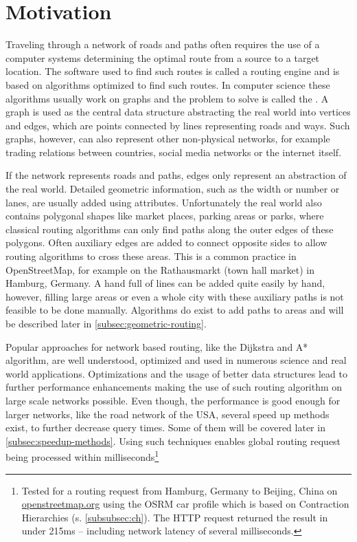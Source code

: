 
\section{Motivation}
	
	Traveling through a network of roads and paths often requires the use of a computer systems determining the optimal route from a source to a target location.
	The software used to find such routes is called a routing engine and is based on algorithms optimized to find such routes.
	In computer science these algorithms usually work on graphs and the problem to solve is called the .
	A graph is used as the central data structure abstracting the real world into vertices and edges, which are points connected by lines representing roads and ways.
	Such graphs, however, can also represent other non-physical networks, for example trading relations between countries, social media networks or the internet itself.
	
	If the network represents roads and paths, edges only represent an abstraction of the real world.
	Detailed geometric information, such as the width or number or lanes, are usually added using attributes.
	Unfortunately the real world also contains polygonal shapes like market places, parking areas or parks, where classical routing algorithms can only find paths along the outer edges of these polygons.
	Often auxiliary edges are added to connect opposite sides to allow routing algorithms to cross these areas.
	This is a common practice in OpenStreetMap, for example on the Rathausmarkt (town hall market) in Hamburg, Germany.
	A hand full of lines can be added quite easily by hand, however, filling large areas or even a whole city with these auxiliary paths is not feasible to be done manually.
	Algorithms do exist to add paths to areas and will be described later in \cref{subsec:geometric-routing}.
	
	Popular approaches for network based routing, like the Dijkstra and A* algorithm, are well understood, optimized and used in numerous science and real world applications.
	Optimizations and the usage of better data structures lead to further performance enhancements making the use of such routing algorithm on large scale networks possible.
	Even though, the performance is good enough for larger networks, like the road network of the USA\cite[5]{aviram-optimizing-dijkstra}, several speed up methods exist, to further decrease query times.
	Some of them will be covered later in \cref{subsec:speedup-methods}.
	Using such techniques enables global routing request being processed within milliseconds\footnote{Tested for a routing request from Hamburg, Germany to Beijing, China on \href{https://www.openstreetmap.org/directions?engine=fossgis\_osrm\_car&route=53.55\%2C10.00\%3B39.91\%2C116.39}{openstreetmap.org} using the OSRM car profile which is based on Contraction Hierarchies (s. \cref{subsubsec:ch}). The HTTP request returned the result in under 215ms -- including network latency of several milliseconds.}
	
